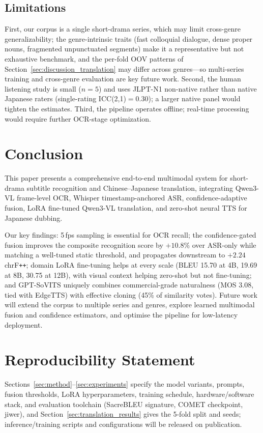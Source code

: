 \documentclass[journal]{IEEEtran}
\begin{document}
\subsection{Limitations}
First, our corpus is a single short-drama series, which may limit cross-genre generalizability; the genre-intrinsic traits (fast colloquial dialogue, dense proper nouns, fragmented unpunctuated segments) make it a representative but not exhaustive benchmark, and the per-fold OOV patterns of Section~\ref{sec:discussion_translation} may differ across genres---so multi-series training and cross-genre evaluation are key future work.
Second, the human listening study is small ($n=5$) and uses JLPT-N1 non-native rather than native Japanese raters (single-rating ICC(2,1)$=0.30$); a larger native panel would tighten the estimates.
Third, the pipeline operates offline; real-time processing would require further OCR-stage optimization.

\section{Conclusion}
\label{sec:conclusion}

This paper presents a comprehensive end-to-end multimodal system for short-drama subtitle recognition and Chinese--Japanese translation, integrating Qwen3-VL frame-level OCR, Whisper timestamp-anchored ASR, confidence-adaptive fusion, LoRA fine-tuned Qwen3-VL translation, and zero-shot neural TTS for Japanese dubbing.

Our key findings: 5\,fps sampling is essential for OCR recall; the confidence-gated fusion improves the composite recognition score by $+10.8\%$ over ASR-only while matching a well-tuned static threshold, and propagates downstream to $+2.24$ chrF\texttt{++}; domain LoRA fine-tuning helps at every scale (BLEU 15.70 at 4B, 19.69 at 8B, 30.75 at 12B), with visual context helping zero-shot but not fine-tuning; and GPT-SoVITS uniquely combines commercial-grade naturalness (MOS 3.08, tied with EdgeTTS) with effective cloning (45\% of similarity votes).
Future work will extend the corpus to multiple series and genres, explore learned multimodal fusion and confidence estimators, and optimise the pipeline for low-latency deployment.

\section*{Reproducibility Statement}
Sections~\ref{sec:method}--\ref{sec:experiments} specify the model variants, prompts, fusion thresholds, LoRA hyperparameters, training schedule, hardware/software stack, and evaluation toolchain (SacreBLEU signature, COMET checkpoint, jiwer), and Section~\ref{sec:translation_results} gives the 5-fold split and seeds; inference/training scripts and configurations will be released on publication.
\end{document}
